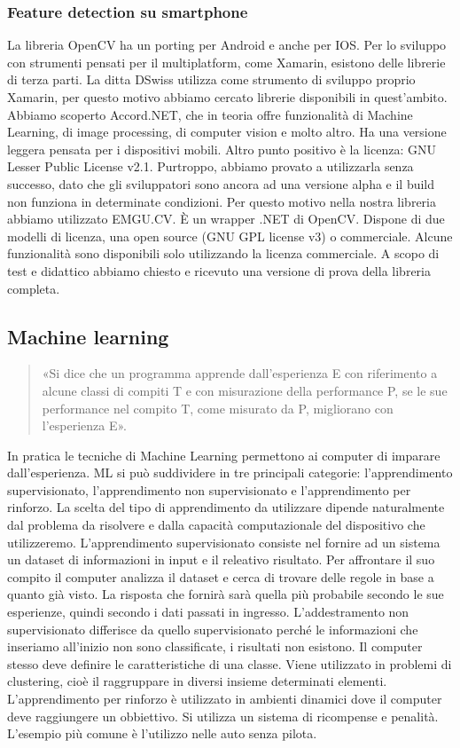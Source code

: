 \documentclass[twoside]{supsistudent}
\begin{document}
\subsubsection{Feature detection su smartphone}%
La libreria OpenCV ha un porting per Android e anche per IOS. Per lo sviluppo con strumenti pensati per il multiplatform, come Xamarin, esistono delle librerie di terza parti. La ditta DSwiss utilizza come strumento di sviluppo proprio Xamarin, per questo motivo abbiamo cercato librerie disponibili in quest'ambito. Abbiamo scoperto Accord.NET, che in teoria offre funzionalità di Machine Learning, di image processing, di computer vision e molto altro. Ha una versione leggera pensata per i dispositivi mobili. Altro punto positivo è la licenza: GNU Lesser Public License v2.1. Purtroppo, abbiamo provato a utilizzarla senza successo, dato che gli sviluppatori sono ancora ad una versione alpha e il build non funziona in determinate condizioni. Per questo motivo nella nostra libreria abbiamo utilizzato EMGU.CV. È un wrapper .NET di OpenCV. Dispone di due modelli di licenza, una open source (GNU GPL license v3) o commerciale. Alcune funzionalità sono disponibili solo utilizzando la licenza commerciale. A scopo di test e didattico abbiamo chiesto e ricevuto una versione di prova della libreria completa. 
\subsection{Machine learning}%
\begin{quote}
    «Si dice che un programma apprende dall’esperienza E con riferimento a alcune classi di compiti T e con misurazione della performance P, se le sue performance nel compito T, come misurato da P, migliorano con l’esperienza E».
\end{quote}
    In pratica le tecniche di Machine Learning permettono ai computer di imparare dall'esperienza. ML si può suddividere in tre principali categorie: l'apprendimento supervisionato, l'apprendimento non supervisionato e l'apprendimento per rinforzo. La scelta del tipo di apprendimento da utilizzare dipende naturalmente dal problema da risolvere e dalla capacità computazionale del dispositivo che utilizzeremo. 
    L'apprendimento supervisionato consiste nel fornire ad un sistema un dataset di informazioni in input e il releativo risultato. Per affrontare il suo compito il computer analizza il dataset e cerca di trovare delle regole in base a quanto già visto. La risposta che fornirà sarà quella più probabile secondo le sue esperienze, quindi secondo i dati passati in ingresso. 
    L'addestramento non supervisionato differisce da quello supervisionato perché le informazioni che inseriamo all'inizio non sono classificate, i risultati non esistono. Il computer stesso deve definire le caratteristiche di una classe. Viene utilizzato in problemi di clustering, cioè il raggruppare in diversi insieme determinati elementi.
    L'apprendimento per rinforzo è utilizzato in ambienti dinamici dove il computer deve raggiungere un obbiettivo. Si utilizza un sistema di ricompense e penalità. L'esempio più comune è l'utilizzo nelle auto senza pilota. 
    
\end{document}
